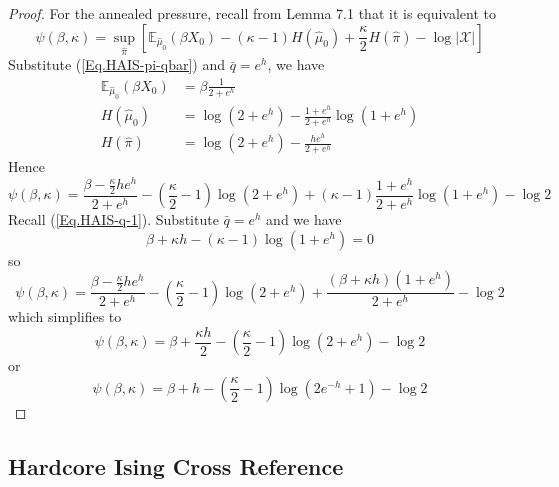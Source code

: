 \documentclass[12pt]{article}
\numberwithin{equation}{section}
\begin{document}
\begin{proof}
    For the annealed pressure, recall from Lemma 7.1 that it is equivalent to
    \begin{equation*}
        \psi(\beta, \kappa) = \sup_{\widehat{\pi}} \left[\mathbb{E}_{\widehat{\mu}_0}(\beta X_0) - (\kappa-1)H(\widehat{\mu}_0) + \frac\kappa2H(\widehat{\pi}) - \log|\mathcal{X}|\right]
    \end{equation*}
    Substitute (\ref{Eq.HAIS-pi-qbar}) and $\bar{q}=e^h$, we have
    \begin{align*}
        \mathbb{E}_{\widehat{\mu}_0}(\beta X_0) & = \beta \frac{1}{2+e^h}                        \\
        H(\widehat{\mu}_0)                      & = \log(2+e^h) - \frac{1+e^h}{2+e^h}\log(1+e^h) \\
        H(\widehat{\pi})                        & = \log(2+e^h) - \frac{he^h}{2+e^h}
    \end{align*}
    Hence
    \begin{equation*}
        \psi(\beta, \kappa) = \frac{\beta - \frac\kappa2he^h}{2+e^h} - \left(\frac\kappa2 - 1\right)\log(2+e^h) + (\kappa-1)\frac{1+e^h}{2+e^h}\log(1+e^h) - \log 2
    \end{equation*}
    Recall (\ref{Eq.HAIS-q-1}). Substitute $\bar{q}=e^h$ and we have
    \begin{equation}
        \beta + \kappa h - (\kappa-1)\log(1+e^h) = 0
    \end{equation}
    so
    \begin{equation*}
        \psi(\beta, \kappa) = \frac{\beta - \frac\kappa2he^h}{2+e^h} - \left(\frac\kappa2 - 1\right)\log(2+e^h) + \frac{(\beta + \kappa h)(1+e^h)}{2+e^h}- \log 2
    \end{equation*}
    which simplifies to
    \begin{equation}
        \psi(\beta, \kappa) = \beta + \frac{\kappa h}{2} - \left(\frac\kappa2 - 1\right)\log(2 + e^h)- \log 2
        \label{Eq.HAIS-psi1}
    \end{equation}
    or
    \begin{equation}
        \psi(\beta, \kappa) = \beta + h - \left(\frac\kappa2 - 1\right)\log(2e^{-h} + 1)- \log 2
        \label{Eq.HAIS-psi2}
    \end{equation}
\end{proof}

\newpage

\subsection{Hardcore Ising Cross Reference}
\end{document}
